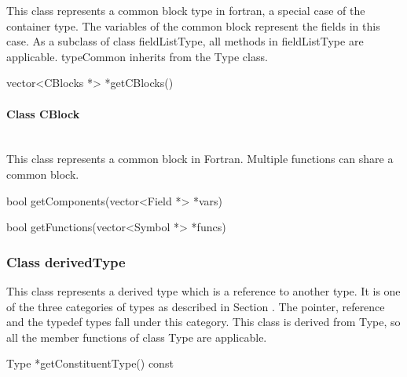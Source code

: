 This class represents a common block type in fortran, a special case of the container type. The variables of the common block represent the fields in this case. As a subclass of class fieldListType, all methods in fieldListType are applicable. typeCommon inherits from the Type class.


\begin{apient}
vector<CBlocks *> *getCBlocks()
\end{apient}

\paragraph{Class CBlock}
\mbox{ }\\

This class represents a common block in Fortran. Multiple functions can share a common block.

\begin{apient}
bool getComponents(vector<Field *> *vars)
\end{apient}

\begin{apient}
bool getFunctions(vector<Symbol *> *funcs)
\end{apient}

\subsubsection{Class derivedType}
This class represents a derived type which is a reference to another type. It is one of the three categories of types as described in Section . The pointer, reference and the typedef types fall under this category. This class is derived from Type, so all the member functions of class Type are applicable.


\begin{apient}
Type *getConstituentType() const
\end{apient}

